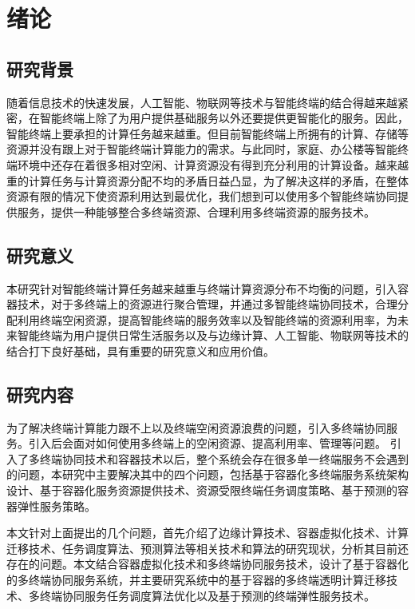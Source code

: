 \chapter{绪论}\label{chap:introduction}

\section{研究背景}
随着信息技术的快速发展，人工智能、物联网等技术与智能终端的结合得越来越紧密，在智能终端上除了为用户提供基础服务以外还要提供更智能化的服务。因此，智能终端上要承担的计算任务越来越重。但目前智能终端上所拥有的计算、存储等资源并没有跟上对于智能终端计算能力的需求。与此同时，家庭、办公楼等智能终端环境中还存在着很多相对空闲、计算资源没有得到充分利用的计算设备。越来越重的计算任务与计算资源分配不均的矛盾日益凸显，为了解决这样的矛盾，在整体资源有限的情况下使资源利用达到最优化，我们想到可以使用多个智能终端协同提供服务，提供一种能够整合多终端资源、合理利用多终端资源的服务技术。
\section{研究意义}
本研究针对智能终端计算任务越来越重与终端计算资源分布不均衡的问题，引入容器技术，对于多终端上的资源进行聚合管理，并通过多智能终端协同技术，合理分配利用终端空闲资源，提高智能终端的服务效率以及智能终端的资源利用率，为未来智能终端为用户提供日常生活服务以及与边缘计算、人工智能、物联网等技术的结合打下良好基础，具有重要的研究意义和应用价值。
\section{研究内容}
为了解决终端计算能力跟不上以及终端空闲资源浪费的问题，引入多终端协同服务。引入后会面对如何使用多终端上的空闲资源、提高利用率、管理等问题。
引入了多终端协同技术和容器技术以后，整个系统会存在很多单一终端服务不会遇到的问题，本研究中主要解决其中的四个问题，包括基于容器化多终端服务系统架构设计、基于容器化服务资源提供技术、资源受限终端任务调度策略、基于预测的容器弹性服务策略。

本文针对上面提出的几个问题，首先介绍了边缘计算技术、容器虚拟化技术、计算迁移技术、任务调度算法、预测算法等相关技术和算法的研究现状，分析其目前还存在的问题。本文结合容器虚拟化技术和多终端协同服务技术，设计了基于容器化的多终端协同服务系统，并主要研究系统中的基于容器的多终端透明计算迁移技术、多终端协同服务任务调度算法优化以及基于预测的终端弹性服务技术。

